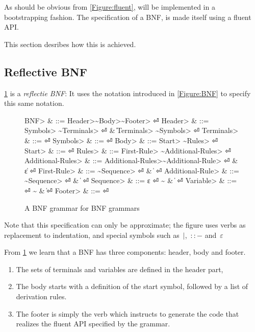 As should be obvious from \cref{Figure:fluent}, \SELF will be implemented
  in a bootstrapping fashion.
The specification of a BNF, is made itself using a fluent API.


This section desribes how this is achieved.

\subsection{Reflective BNF}
\cref{Figure:BNF:BNF} is a \emph{reflectie BNF}:
It uses the notation introduced in \cref{Figure:BNF}
  to specify this same notation.


\begin{figure}[H]
  \begin{Grammar}
    \begin{aligned}
      \<BNF> & ::= \<Header>\~\<Body>\~\<Footer> \hfill⏎
      \<Header> & ::= \<Symbols> \~\<Terminals> \hfill⏎
      {} & \| \<Terminals> \~\<Symbols> \hfill⏎
      \<Terminals> & ::= \hfill⏎
      \<Symbols> & ::= \hfill⏎
      \<Body> & ::= \<Start> \~\<Rules> \hfill⏎
      \<Start> & ::=  \hfill⏎
      \<Rules> & ::= \<First-Rule> \~\<Additional-Rules> \hfill⏎
      \<Additional-Rules> & ::= \<Additional-Rules>\~\<Additional-Rule> \hfill⏎
      {} & \| ε \hfill⏎
      \<First-Rule> & ::= \~\<Sequence> \hfill⏎
      {} & \|  \hfill⏎
      \<Additional-Rule> & ::= \~\<Sequence> \hfill⏎
      {} & \|  \hfill⏎
      \<Sequence> & ::= ε \hfill⏎
      {\~} & \|  \hfill⏎
      \<Variable> & ::=  \hfill⏎
      {\~} & \| \hfill⏎
      \<Footer> & ::= \hfill⏎
    \end{aligned}
  \end{Grammar}
  \caption{A BNF grammar for BNF grammars}
  \label{Figure:BNF:BNF}
\end{figure}

Note that this specification can only be approximate;
  the figure uses verbs as replacement to indentation,
  and special symbols such as~$|$,~$::-$ and~$ε$

From \cref{Figure:BNF:BNF} we learn 
  that a BNF has three components: header, body and footer.
  \begin{enumerate}
    \item The sets of terminals and variables are defined in the header part, 
    \item The body starts with a definition of the start symbol, followed by a list of derivation
  rules. 
\item The footer is simply the verb  which instructs \SELF
  to generate the code that realizes the fluent API specified by the grammar.
  \end{enumerate}

